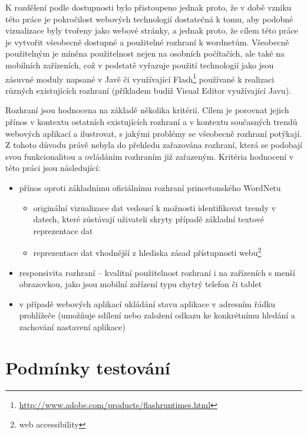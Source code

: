 \documentclass[a4paper, 11pt, oneside]{book}
\begin{document}
				K rozdělení podle dostupnosti bylo přistoupeno jednak proto, že v době vzniku této práce je pokročilost webových technologií dostatečná k tomu, aby podobné vizualizace byly tvořeny jako webové stránky, a jednak proto, že cílem této práce je vytvořit všeobecně dostupné a použitelné rozhraní k wordnetům. Všeobecně použitelným je míněna použitelnost nejen na osobních počítačích, ale také na mobilních zařízeních, což v podstatě vyřazuje použití technologií jako jsou zásuvné moduly napsané v Javě či využívající Flash\footnote{\url{http://www.adobe.com/products/flashruntimes.html}} používané k realizaci různých existujících rozhraní (příkladem budiž Visual Editor využívající Javu). 

				Rozhraní jsou hodnocena na základě několika kritérií. Cílem je porovnat jejich přínos v kontextu ostatních existujících rozhraní a v kontextu současných trendů webových aplikací a ilustrovat, s jakými problémy se všeobecně rozhraní potýkají.  Z tohoto důvodu právě nebyla do přehledu zařazována rozhraní, která se podobají svou funkcionalitou a ovládáním rozhraním již zařazeným. Kritéria hodnocení v této práci jsou následující:

					\begin{itemize}
						\item přínos oproti základnímu oficiálnímu rozhraní princetonského WordNetu
							\begin{itemize}
								\item originální vizualizace dat vedoucí k možnosti identifikovat trendy v datech, které zůstávají uživateli skryty případě základní textové reprezentace dat
								\item reprezentace dat vhodnější z hlediska zásad přístupnosti webu\footnote{web accessibility}
							\end{itemize}
						\item responsivita rozhraní -- kvalitní použitelnost rozhraní i na zařízeních s menší obrazovkou, jako jsou mobilní zařízení typu chytrý telefon či tablet
						\item v případě webových aplikací ukládání stavu aplikace v adresním řádku prohlížeče (umožňuje sdílení nebo založení odkazu ke konkrétnímu hledání a zachování nastavení aplikace)
					\end{itemize}

			\section{Podmínky testování}
\end{document}
